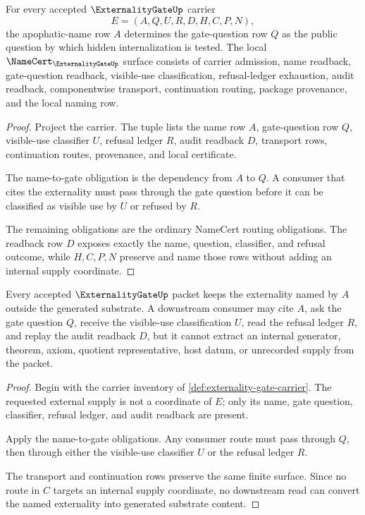 \begin{theorem}
\label{thm:externality-gate-name-to-gate-obligations}
For every accepted $\ExternalityGateUp$ carrier
$$
E=(A,Q,U,R,D,H,C,P,N),
$$
the apophatic-name row $A$ determines the gate-question row $Q$ as the public
question by which hidden internalization is tested. The local
$\NameCert_{\ExternalityGateUp}$ surface consists of carrier admission, name
readback, gate-question readback, visible-use classification, refusal-ledger
exhaustion, audit readback, componentwise transport, continuation routing,
package provenance, and the local naming row.
\end{theorem}
\begin{proof}
Project the carrier. The tuple lists the name row $A$, gate-question row $Q$,
visible-use classifier $U$, refusal ledger $R$, audit readback $D$, transport
rows, continuation routes, provenance, and local certificate.

The name-to-gate obligation is the dependency from $A$ to $Q$. A consumer that
cites the externality must pass through the gate question before it can be
classified as visible use by $U$ or refused by $R$.

The remaining obligations are the ordinary NameCert routing obligations. The
readback row $D$ exposes exactly the name, question, classifier, and refusal
outcome, while $H,C,P,N$ preserve and name those rows without adding an
internal supply coordinate.
\end{proof}

\begin{theorem}
\label{thm:externality-gate-non-internalization}
Every accepted $\ExternalityGateUp$ packet keeps the externality named by $A$
outside the generated substrate. A downstream consumer may cite $A$, ask the
gate question $Q$, receive the visible-use classification $U$, read the refusal
ledger $R$, and replay the audit readback $D$, but it cannot extract an
internal generator, theorem, axiom, quotient representative, host datum, or
unrecorded supply from the packet.
\end{theorem}
\begin{proof}
Begin with the carrier inventory of
\autoref{def:externality-gate-carrier}. The requested external supply is not a
coordinate of $E$; only its name, gate question, classifier, refusal ledger,
and audit readback are present.

Apply the name-to-gate obligations. Any consumer route must pass through $Q$,
then through either the visible-use classifier $U$ or the refusal ledger $R$.

The transport and continuation rows preserve the same finite surface. Since no
route in $C$ targets an internal supply coordinate, no downstream read can
convert the named externality into generated substrate content.
\end{proof}

